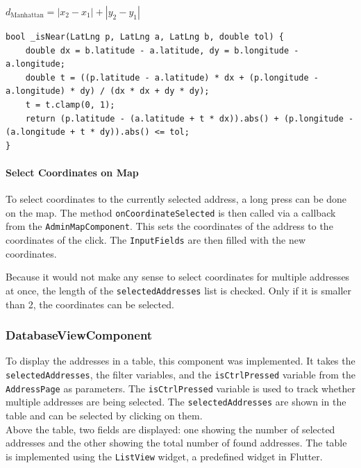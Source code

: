 \begin{center}
    {\Large  $d_{\text{Manhattan}} = |x_2 - x_1| + |y_2 - y_1|$}
\end{center}

\lstset{style=mycsharp, caption=isNear method}
\begin{lstlisting}
bool _isNear(LatLng p, LatLng a, LatLng b, double tol) {
    double dx = b.latitude - a.latitude, dy = b.longitude - a.longitude;
    double t = ((p.latitude - a.latitude) * dx + (p.longitude - a.longitude) * dy) / (dx * dx + dy * dy);
    t = t.clamp(0, 1);
    return (p.latitude - (a.latitude + t * dx)).abs() + (p.longitude - (a.longitude + t * dy)).abs() <= tol;
}
\end{lstlisting}



\paragraph{Select Coordinates on Map}
\label{fig:Select Coordinates on Map}

To select coordinates to the currently selected address, a long press can be done on the map. The method \texttt{onCoordinateSelected} is then called via a callback from the \texttt{AdminMapComponent}. This sets the coordinates of the address to the coordinates of the click. The \texttt{InputFields} are then filled with the new coordinates.\

Because it would not make any sense to select coordinates for multiple addresses at once, the length of the \texttt{selectedAddresses} list is checked. Only if it is smaller than 2, the coordinates can be selected.


\subsubsection{DatabaseViewComponent}
\label{fig:DatabaseViewComponent}
To display the addresses in a table, this component was implemented. It takes the \texttt{selectedAddresses}, the filter variables, and the \texttt{isCtrlPressed} variable from the \texttt{AddressPage} as parameters. The \texttt{isCtrlPressed} variable is used to track whether multiple addresses are being selected. The \texttt{selectedAddresses} are shown in the table and can be selected by clicking on them.\\

Above the table, two fields are displayed: one showing the number of selected addresses and the other showing the total number of found addresses. The table is implemented using the \texttt{ListView} widget, a predefined widget in Flutter.


